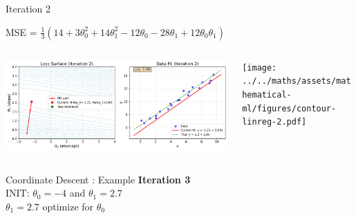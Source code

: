\documentclass{beamer}
\begin{document}
\begin{frame}{Iteration 2}

MSE = $\frac{1}{3}(14+3\theta_{0}^{2}+14\theta_{1}^{2}-12\theta_{0}-28\theta_{1}+12\theta_{0}\theta_{1})$\\

\begin{columns}
\begin{column}{0.6\textwidth}
\begin{adjustbox}{max totalsize={\textwidth},center}
\includegraphics[width=\textwidth]{../../maths/assets/mathematical-ml/figures/gradient-descent-2.pdf}
\end{adjustbox}

\end{column}
\begin{column}{0.5\textwidth}
\begin{adjustbox}{max totalsize={\textwidth},center}
\texttt{[image: ../../maths/assets/mathematical-ml/figures/contour-linreg-2.pdf]}
\end{adjustbox}
\end{column}
\end{columns}


\end{frame}

\begin{frame}{Coordinate Descent : Example}
\textbf{Iteration 3}\\
\vspace{0.5cm}
INIT: $\theta_{0} = -4$ and $\theta_{1}  = 2.7$\\

\vspace{0.5cm}
$\theta_1 = 2.7$ optimize for $\theta_{0}$\\ 


\end{frame}
\end{document}
